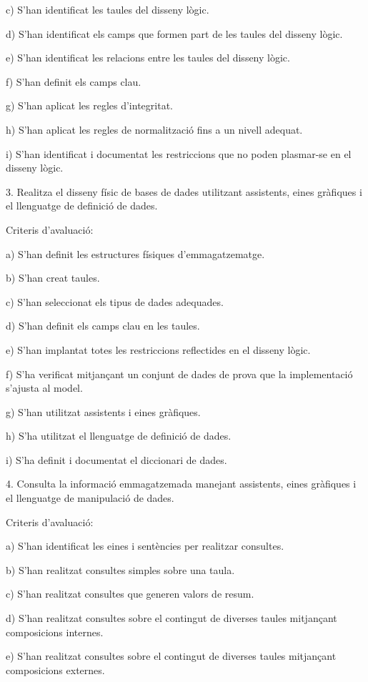 \documentclass[catalan, a4paper, 12pt, titlepage]{article}
\begin{document}
c) S'han identificat les taules del disseny lògic.

d) S'han identificat els camps que formen part de les taules del disseny lògic.

e) S'han identificat les relacions entre les taules del disseny lògic.

f) S'han definit els camps clau.

g) S'han aplicat les regles d'integritat.

h) S'han aplicat les regles de normalització fins a un nivell adequat.

i) S'han identificat i documentat les restriccions que no poden plasmar-se en el disseny lògic.

3. Realitza el disseny físic de bases de dades utilitzant assistents, eines gràfiques i el llenguatge de definició de dades.

Criteris d'avaluació:

a) S'han definit les estructures físiques d'emmagatzematge.

b) S'han creat taules.

c) S'han seleccionat els tipus de dades adequades.

d) S'han definit els camps clau en les taules.

e) S'han implantat totes les restriccions reflectides en el disseny lògic.

f) S'ha verificat mitjançant un conjunt de dades de prova que la implementació s'ajusta al model.

g) S'han utilitzat assistents i eines gràfiques.

h) S'ha utilitzat el llenguatge de definició de dades.

i) S'ha definit i documentat el diccionari de dades.

4. Consulta la informació emmagatzemada manejant assistents, eines gràfiques i el llenguatge de manipulació de dades.

Criteris d'avaluació:

a) S'han identificat les eines i sentències per realitzar consultes.

b) S'han realitzat consultes simples sobre una taula.

c) S'han realitzat consultes que generen valors de resum.

d) S'han realitzat consultes sobre el contingut de diverses taules mitjançant composicions internes.

e) S'han realitzat consultes sobre el contingut de diverses taules mitjançant composicions externes.
\end{document}
